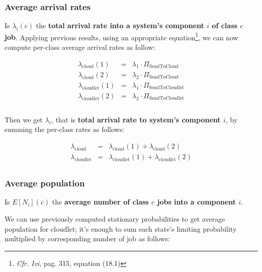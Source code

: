 \documentclass[10pt,a4paper]{article}
\begin{document}
\subsubsection{Average arrival rates}

Is $\lambda_i(c)$ the \textbf{total arrival rate into a system's component $i$ of class $c$ job}. Applying previous results, using an appropriate equation\footnote{\textit{Cfr.} \textit{Ivi}, pag. 315, equation (18.1)}, we can now compute per-class average arrival rates as follow:

\begin{equation}
\begin{array} {rcl}

\lambda_{\text{cloud}}(1) & = & \lambda_1\cdot \Pi_{\text{SendToCloud}} \\
\lambda_{\text{cloud}}(2) & = & \lambda_2\cdot \Pi_{\text{SendToCloud}} \\
\lambda_{\text{cloudlet}}(1) & = & \lambda_1\cdot \Pi_{\text{SendToCloudlet}} \\
\lambda_{\text{cloudlet}}(2) & = & \lambda_2\cdot \Pi_{\text{SendToCloudlet}} \\\\
\end{array}
\end{equation}

Then we get $\lambda_i$, that is \textbf{total arrival rate to system's component $i$}, by summing the per-class rates as follows:

\begin{equation}
\begin{array} {rcl}

\lambda_{\text{cloud}} & = & \lambda_{\text{cloud}}(1) + \lambda_{\text{cloud}}(2) \\
\lambda_{\text{cloudlet}} & = & \lambda_{\text{cloudlet}}(1) + \lambda_{\text{cloudlet}}(2) \\
\end{array}
\end{equation}


\subsubsection{Average population}

Is $E[N_i](c)$ the \textbf{average number of class $c$ jobs into a component $i$}. 

We can use previously computed stationary probabilities to get average population for cloudlet; it's enough to sum each state's limiting probability multiplied by corresponding number of job as follows:
\end{document}

